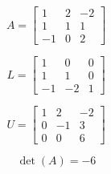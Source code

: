 \[
A=\left[
\begin{array}{ccc}
1 & 2 & -2 \\
1 & 1 & 1\\
-1 & 0 & 2
\end{array}\right]
\]
\bigskip

\[ 
L=\left[
\begin{array}{ccc}
1 & 0 & 0 \\
1 & 1 & 0\\
-1 & -2 & 1
\end{array}
\right]
\]

\[ 
U=\left[
\begin{array}{ccc}
 1& 2 & -2 \\
 0 & -1 & 3 \\
 0 & 0 & 6
\end{array}
\right] 
\]

\bigskip
\[ \det(A)=-6 \]
